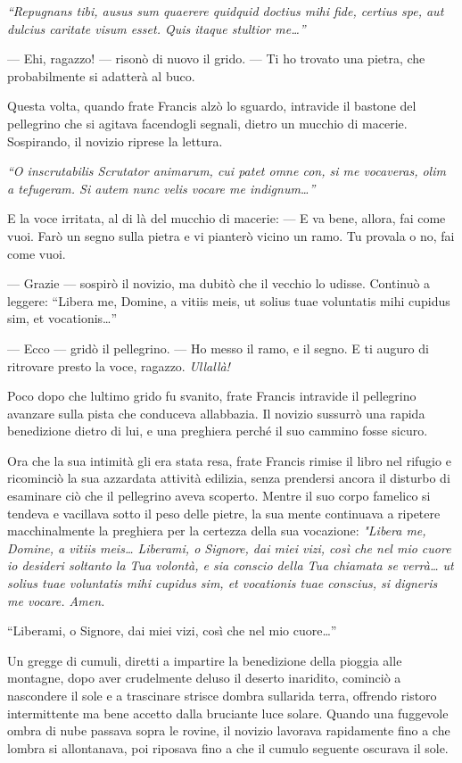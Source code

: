 \emph{``Repugnans tibi, ausus sum quaerere quidquid doctius mihi fide,
	certius spe, aut dulcius caritate visum esset. Quis itaque stultior
	me\ldots''}

--- Ehi, ragazzo! --- risonò di nuovo il grido. --- Ti ho trovato una
pietra, che probabilmente si adatterà al buco.

Questa volta, quando frate Francis alzò lo sguardo, intravide il bastone
del pellegrino che si agitava facendogli segnali, dietro un mucchio di
macerie. Sospirando, il novizio riprese la lettura.

\emph{``O inscrutabilis Scrutator animarum, cui patet omne con, si me
	vocaveras, olim a tefugeram. Si autem nunc velis vocare me
	indignum\ldots''}

E la voce irritata, al di là del mucchio di macerie: --- E va bene,
allora, fai come vuoi. Farò un segno sulla pietra e vi pianterò vicino
un ramo. Tu provala o no, fai come vuoi.

--- Grazie --- sospirò il novizio, ma dubitò che il vecchio lo udisse.
Continuò a leggere: ``Libera me, Domine, a vitiis meis, ut solius tuae
voluntatis mihi cupidus sim, et vocationis\ldots''

--- Ecco --- gridò il pellegrino. --- Ho messo il ramo, e il segno. E ti
auguro di ritrovare presto la voce, ragazzo. \emph{Ullallà!}

Poco dopo che l\textquotesingle ultimo grido fu svanito, frate Francis
intravide il pellegrino avanzare sulla pista che conduceva
all\textquotesingle abbazia. Il novizio sussurrò una rapida benedizione
dietro di lui, e una preghiera perché il suo cammino fosse sicuro.

Ora che la sua intimità gli era stata resa, frate Francis rimise il
libro nel rifugio e ricominciò la sua azzardata attività edilizia, senza
prendersi ancora il disturbo di esaminare ciò che il pellegrino aveva
scoperto. Mentre il suo corpo famelico si tendeva e vacillava sotto il
peso delle pietre, la sua mente continuava a ripetere macchinalmente la
preghiera per la certezza della sua vocazione: \emph{"Libera me, Domine,
	a vitiis meis\ldots{} Liberami, o Signore, dai miei vizi, così che nel
	mio cuore io desideri soltanto la Tua volontà, e sia conscio della Tua
	chiamata se verrà\ldots{} ut solius tuae voluntatis mihi cupidus sim, et
	vocationis tuae conscius, si digneris me vocare. Amen.}

``Liberami, o Signore, dai miei vizi, così che nel mio cuore\ldots''

Un gregge di cumuli, diretti a impartire la benedizione della pioggia
alle montagne, dopo aver crudelmente deluso il deserto inaridito,
cominciò a nascondere il sole e a trascinare strisce
d\textquotesingle ombra sull\textquotesingle arida terra, offrendo
ristoro intermittente ma bene accetto dalla bruciante luce solare.
Quando una fuggevole ombra di nube passava sopra le rovine, il novizio
lavorava rapidamente fino a che l\textquotesingle ombra si allontanava,
poi riposava fino a che il cumulo seguente oscurava il sole.

